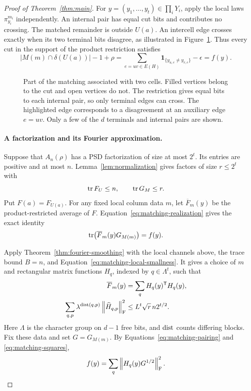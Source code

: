 \begin{proof}[Proof of Theorem~\ref{thm:main}]
For $y=(y_1,\ldots,y_t)\in\prod_iY_i$, apply the local laws
$\pi_{y_i}^{m_i}$ independently.  An internal pair has equal cut
bits and contributes no crossing.  The matched remainder is
outside $U(a)$.  An intercell edge crosses exactly when its two
terminal bits disagree, as illustrated in
Figure~\ref{fig:matching-cells}.  Thus every cut in the support
of the product restriction satisfies
\begin{equation}\label{eq:matching-realization}
 |M(m)\cap\delta(U(a))|-1+\rho
 =\sum_{e=uv\in E(H)}\mathbf1_{\{y_{u,e}\ne y_{v,e}\}}-\epsilon
 =f(y).
\end{equation}

\begin{figure}[tbp]
\centering

\caption{Part of the matching associated with two cells.  Filled vertices
belong to the cut and open vertices do not.  The restriction gives equal
bits to each internal pair, so only terminal edges can cross.  The
highlighted edge corresponds to a disagreement at an auxiliary edge
$e=uv$.  Only a few of the $d$ terminals and internal pairs are shown.}
\label{fig:matching-cells}
\end{figure}

\paragraph{A factorization and its Fourier approximation.}
Suppose that $A_n(\rho)$ has a PSD factorization of size at most
$2^t$.  Its entries are positive and at most $n$.
Lemma~\ref{lem:normalization} gives factors of size $r\le2^t$ with
\[
 \operatorname{tr} F_U\le n,\qquad \operatorname{tr} G_M\le r.
\]
Put $F(a)=F_{U(a)}$.  For any fixed local column data $m$, let
$\overline F_m(y)$ be the product-restricted average of $F$.
Equation~\eqref{eq:matching-realization} gives the exact identity
\begin{equation}\label{eq:matching-pairing}
 \operatorname{tr}\bigl(\overline F_m(y)G_{M(m)}\bigr)=f(y).
\end{equation}

Apply Theorem~\ref{thm:fourier-smoothing} with the local channels
above, the trace bound $B=n$, and
Equation~\eqref{eq:matching-local-smallness}.  It gives a choice of
$m$ and rectangular matrix functions $H_q$, indexed by
$q\in\Lambda^t$, such that
\begin{align}
 \overline F_m(y)&=\sum_q H_q(y)^{\mathsf T}H_q(y),
 \label{eq:matching-squares}\\
 \sum_{q,p}\lambda^{\operatorname{dist}(q,p)}\left\lVert\widehat H_{q,p}\right\rVert_{\mathrm F}^2
 &\le L^t\sqrt r\,n2^{t/2}.
 \label{eq:matching-fourier-bound}
\end{align}
Here $\Lambda$ is the character group on $d-1$ free bits, and
$\operatorname{dist}$ counts differing blocks.  Fix these data and set
$G=G_{M(m)}$.  By Equations~\eqref{eq:matching-pairing} and
\eqref{eq:matching-squares},
\begin{equation}\label{eq:matching-full-squares}
 f(y)=\sum_q\left\lVert H_q(y)G^{1/2}\right\rVert_{\mathrm F}^2.
\end{equation}


\end{proof}
